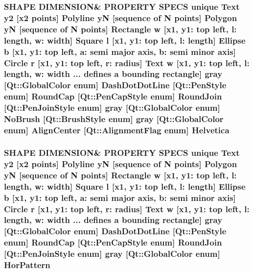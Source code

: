 \subsubsection[{\texorpdfstring{Helvetica}{Helvetica}}]{\setlength{\rightskip}{0pt plus 5cm}S\+H\+A\+PE D\+I\+M\+E\+N\+S\+I\+ON\& P\+R\+O\+P\+E\+R\+TY S\+P\+E\+CS unique {\bf Text} {\bf y2} \mbox{[}{\bf x2} points\mbox{]} {\bf Polyline} yN \mbox{[}sequence of N points\mbox{]} {\bf Polygon} yN \mbox{[}sequence of N points\mbox{]} {\bf Rectangle} w \mbox{[}{\bf x1}, y1\+: top left, l\+: length, w\+: width\mbox{]} {\bf Square} {\bf l} \mbox{[}{\bf x1}, y1\+: top left, l\+: length\mbox{]} {\bf Ellipse} b \mbox{[}{\bf x1}, y1\+: top left, a\+: semi major axis, b\+: semi minor axis\mbox{]} {\bf Circle} r \mbox{[}{\bf x1}, y1\+: top left, r\+: radius\mbox{]} {\bf Text} w \mbox{[}{\bf x1}, y1\+: top left, l\+: length, w\+: width ... defines {\bf a} bounding rectangle\mbox{]} gray \mbox{[}Qt\+::\+Global\+Color enum\mbox{]} Dash\+Dot\+Dot\+Line \mbox{[}Qt\+::\+Pen\+Style enum\mbox{]} Round\+Cap \mbox{[}{\bf Qt\+::\+Pen\+Cap\+Style} enum\mbox{]} Round\+Join \mbox{[}{\bf Qt\+::\+Pen\+Join\+Style} enum\mbox{]} gray \mbox{[}Qt\+::\+Global\+Color enum\mbox{]} No\+Brush \mbox{[}{\bf Qt\+::\+Brush\+Style} enum\mbox{]} gray \mbox{[}Qt\+::\+Global\+Color enum\mbox{]} Align\+Center \mbox{[}Qt\+::\+Alignment\+Flag enum\mbox{]} Helvetica}\hypertarget{shape__input__file__specs_8txt_a29385f48845f4580b6fa961e5dfbc5d1}{}\label{shape__input__file__specs_8txt_a29385f48845f4580b6fa961e5dfbc5d1}
\subsubsection[{\texorpdfstring{Hor\+Pattern}{HorPattern}}]{\setlength{\rightskip}{0pt plus 5cm}S\+H\+A\+PE D\+I\+M\+E\+N\+S\+I\+ON\& P\+R\+O\+P\+E\+R\+TY S\+P\+E\+CS unique {\bf Text} {\bf y2} \mbox{[}{\bf x2} points\mbox{]} {\bf Polyline} yN \mbox{[}sequence of N points\mbox{]} {\bf Polygon} yN \mbox{[}sequence of N points\mbox{]} {\bf Rectangle} w \mbox{[}{\bf x1}, y1\+: top left, l\+: length, w\+: width\mbox{]} {\bf Square} {\bf l} \mbox{[}{\bf x1}, y1\+: top left, l\+: length\mbox{]} {\bf Ellipse} b \mbox{[}{\bf x1}, y1\+: top left, a\+: semi major axis, b\+: semi minor axis\mbox{]} {\bf Circle} r \mbox{[}{\bf x1}, y1\+: top left, r\+: radius\mbox{]} {\bf Text} w \mbox{[}{\bf x1}, y1\+: top left, l\+: length, w\+: width ... defines {\bf a} bounding rectangle\mbox{]} gray \mbox{[}Qt\+::\+Global\+Color enum\mbox{]} Dash\+Dot\+Dot\+Line \mbox{[}Qt\+::\+Pen\+Style enum\mbox{]} Round\+Cap \mbox{[}{\bf Qt\+::\+Pen\+Cap\+Style} enum\mbox{]} Round\+Join \mbox{[}{\bf Qt\+::\+Pen\+Join\+Style} enum\mbox{]} gray \mbox{[}Qt\+::\+Global\+Color enum\mbox{]} Hor\+Pattern}\hypertarget{shape__input__file__specs_8txt_a97b62d570251a80c34bc3055dab54ac6}{}\label{shape__input__file__specs_8txt_a97b62d570251a80c34bc3055dab54ac6}
